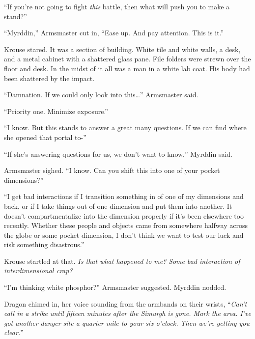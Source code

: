 ``If you're not going to fight \emph{this} battle, then what will push you to make a stand?''



``Myrddin,'' Armsmaster cut in, ``Ease up.  And pay attention.  This is it.''



Krouse stared.  It was a section of building.  White tile and white walls, a desk, and a metal cabinet with a shattered glass pane.  File folders were strewn over the floor and desk.  In the midst of it all was a man in a white lab coat.  His body had been shattered by the impact.



``Damnation.  If we could only look into this\ldots'' Armsmaster said.



``Priority one.  Minimize exposure.''



``I know.  But this stands to answer a great many questions.  If we can find where she opened that portal to-''



``If she's answering questions for us, we don't want to know,'' Myrddin said.



Armsmaster sighed.  ``I know.  Can you shift this into one of your pocket dimensions?''



``I get bad interactions if I transition something in of one of my dimensions and back, or if I take things out of one dimension and put them into another.  It doesn't compartmentalize into the dimension properly if it's been elsewhere too recently.  Whether these people and objects came from somewhere halfway across the globe or some pocket dimension, I don't think we want to test our luck and risk something disastrous.''



Krouse startled at that.  \emph{Is that what happened to me?  }\emph{Some bad interaction of interdimensional crap?}



``I'm thinking white phosphor?''  Armsmaster suggested.  Myrddin nodded.



Dragon chimed in, her voice sounding from the armbands on their wrists, ``\emph{Can't call in a strike until fifteen minutes after the Simurgh is gone.  Mark the area.  I've got another danger site a quarter-mile to your six o'clock.  Then we're getting you clear.}''



